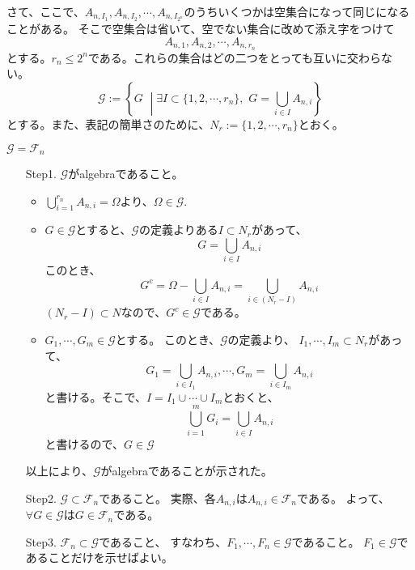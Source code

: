     さて、ここで、$A_{n,I_1},A_{n,I_2},\cdots,A_{n,I_{2^n}}$のうちいくつかは空集合になって同じになることがある。
    そこで空集合は省いて、空でない集合に改めて添え字をつけて
    \[
      A_{n,1},A_{n,2},\cdots,A_{n,r_n}
    \]
    とする。$r_n \leq 2^n$である。これらの集合はどの二つをとっても互いに交わらない。
    \[
      \mathcal{G} := \left\{ G \,\, \middle| \exists I \subset \{1,2,\cdots, r_n\}, \,\, G =\bigcup_{i \in I}A_{n,i} \right\}
    \]
    とする。また、表記の簡単さのために、$N_r := \{1,2,\cdots,r_n\}$とおく。
    \begin{claim*}
      $\mathcal{G} = \mathcal{F}_n$
    \end{claim*}

    \begin{enumerate}
      \item[Step1.] $\mathcal{G}$がalgebraであること。
        \begin{itemize}
          \item $\displaystyle{\bigcup_{i=1}^{r_n} A_{n,i} = \Omega}$より、$\Omega \in \mathcal{G}$.
          \item $G \in \mathcal{G}$とすると、$\mathcal{G}$の定義よりある$I \subset N_r$があって、
            \[
              G = \bigcup_{i \in I}A_{n,i}
            \]
            このとき、
            \[
              G^c = \Omega - \bigcup_{i \in I}A_{n,i} = \bigcup_{i \in (N_r - I)}A_{n,i}
            \]
            $(N_r - I) \subset N$なので、$G^c \in \mathcal{G}$である。
          \item $G_1,\cdots,G_m \in \mathcal{G}$とする。
            このとき、$\mathcal{G}$の定義より、
            $I_1,\cdots,I_m \subset N_r$があって、
            \[
              G_1 = \bigcup_{i \in I_1}A_{n,i}, \cdots, G_m = \bigcup_{i \in I_m}A_{n,i}
            \]
            と書ける。そこで、$I = I_1 \cup \cdots \cup I_m$とおくと、
            \[
              \bigcup_{i=1}^m G_i = \bigcup_{i \in I}A_{n,i}
            \]
            と書けるので、$G \in \mathcal{G}$
        \end{itemize}
        以上により、$\mathcal{G}$がalgebraであることが示された。
      \item[Step2.] $\mathcal{G} \subset \mathcal{F}_n$であること。
        実際、各$A_{n,i}$は$A_{n,i} \in \mathcal{F}_n$である。
        よって、$\forall G \in \mathcal{G}$は$G \in \mathcal{F}_n$である。
      \item[Step3.] $\mathcal{F}_n \subset \mathcal{G}$であること、
      すなわち、$F_1,\cdots,F_n \in \mathcal{G}$であること。
      $F_1 \in \mathcal{G}$であることだけを示せばよい。

\end{enumerate}
